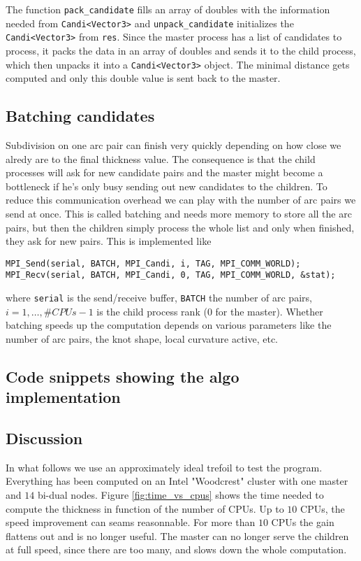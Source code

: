 \documentclass{article}
\begin{document}
The function \verb+pack_candidate+ fills an array of doubles with the information
needed from \verb+Candi<Vector3>+ and \verb+unpack_candidate+ initializes the
\verb+Candi<Vector3>+ from \verb+res+. Since the master process has a list
of candidates to process, it packs the data in an array of doubles and sends it to
the child process, which then unpacks it into a \verb+Candi<Vector3>+ object.
The minimal distance gets computed and only this double value is sent back to
the master.

\subsection{Batching candidates}

Subdivision on one arc pair can finish very quickly depending on how close
we alredy are to the final thickness value. The consequence is that the child
processes will ask for new candidate pairs and the master might become a bottleneck
if he's only busy sending out new candidates to the children. To reduce this
communication overhead we can play with the number of arc pairs we send at once.
This is called batching and needs more memory to store all the arc pairs, but then
the children simply process the whole list and only when finished, they ask for
new pairs. This is implemented like

\begin{verbatim}
MPI_Send(serial, BATCH, MPI_Candi, i, TAG, MPI_COMM_WORLD);
MPI_Recv(serial, BATCH, MPI_Candi, 0, TAG, MPI_COMM_WORLD, &stat);
\end{verbatim}

where \verb+serial+ is the send/receive buffer, \verb+BATCH+ the number of arc
pairs, $i=1,\ldots, \#CPUs-1$ is the child process rank ($0$ for the master). Whether
batching speeds up the computation depends on various parameters like the number
of arc pairs, the knot shape, local curvature active, etc.

\subsection{Code snippets showing the algo implementation}

\subsection{Discussion}

In what follows we use an approximately ideal trefoil to test the program. Everything
has been computed on an Intel "Woodcrest" cluster with one master and $14$ bi-dual nodes.
Figure \ref{fig:time_vs_cpus} shows the time needed to compute the thickness in function
of the number of CPUs. Up to $10$ CPUs, the speed improvement can seams reasonnable. For more
than $10$ CPUs the gain flattens out and is no longer useful. The master can no longer
serve the children at full speed, since there are too many, and slows down the whole computation.
\end{document}
